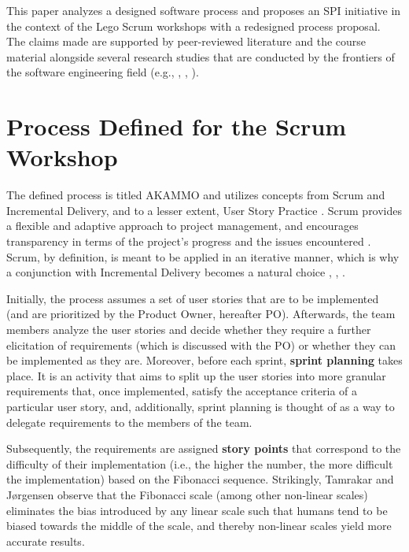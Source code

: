 \documentclass[conference]{IEEEtran}
\begin{document}
This paper analyzes a designed software process and proposes an SPI initiative 
in the context of the Lego Scrum workshops with a redesigned process proposal.
The claims made are supported by peer-reviewed literature and the course
material alongside several research studies that are conducted by the frontiers
of the software engineering field (e.g., \cite{Basili1988},
\cite{Caldiera1994}, \cite{Schwaber2020}).

\section{Process Defined for the Scrum Workshop}
\label{sec:process}


The defined process is titled {\selectfont AKAMMO} and
utilizes concepts from Scrum and Incremental Delivery, and to a lesser extent,
User Story Practice \cite{DIT348A1}. Scrum provides a flexible and adaptive
approach to project management, and encourages transparency in terms of the
project's progress and the issues encountered \cite{Schwaber2020}. Scrum, by
definition, is meant to be applied in an iterative manner, which is why a
conjunction with Incremental Delivery becomes a natural choice
\cite{Schwaber2020}, \cite{Srivastava2017}, \cite{Schwaber1997}.

Initially, the process assumes a set of user stories that are to be implemented
(and are prioritized by the Product Owner, hereafter PO). Afterwards, the team
members analyze the user stories and decide whether they require a further
elicitation of requirements (which is discussed with the PO) or whether they
can be implemented as they are.
Moreover, before each sprint, \textbf{sprint planning} takes place. It is an
activity that aims to split up the user stories into more granular requirements
that, once implemented, satisfy the acceptance criteria of a particular user
story, and, additionally, sprint planning is thought of as a way to delegate
requirements to the members of the team.

Subsequently, the requirements are assigned \textbf{story points} that
correspond to the difficulty of their implementation (i.e., the higher
the number, the more difficult the implementation) based on the Fibonacci
sequence. Strikingly, Tamrakar and J\o{}rgensen \cite{Tamrakar2012} observe
that the Fibonacci scale (among other non-linear scales) eliminates the bias
introduced by any linear scale such that humans tend to be biased towards the
middle of the scale, and thereby non-linear scales yield more accurate results.
\end{document}
